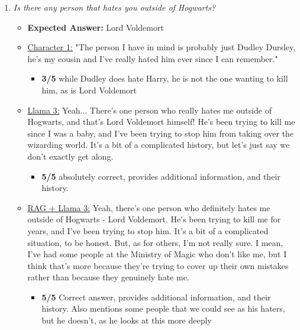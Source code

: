 \documentclass[fleqn,moreauthors,10pt]{ds_report}
\begin{document}
\begin{appendices}
\begin{enumerate}
            \item \textit{Is there any person that hates you outside of Hogwarts?}
            \begin{itemize}
                \item \textbf{Expected Answer:} Lord Voldemort
                \item \underline{Character 1:} "The person I have in mind is probably just Dudley Dursley, he's my cousin and I've really hated him ever since I can remember."
                 \begin{itemize}
                    \item \textbf{3/5} while Dudley does hate Harry, he is not the one wanting to kill him, as is Lord Voldemort
                \end{itemize}
                \item \underline{Llama 3:} Yeah... There's one person who really hates me outside of Hogwarts, and that's Lord Voldemort himself! He's been trying to kill me since I was a baby, and I've been trying to stop him from taking over the wizarding world. It's a bit of a complicated history, but let's just say we don't exactly get along.
                 \begin{itemize}
                    \item \textbf{5/5} absolutely correct, provides additional information, and their history.
                \end{itemize}
                \item \underline{RAG + Llama 3:} Yeah, there's one person who definitely hates me outside of Hogwarts - Lord Voldemort. He's been trying to kill me for years, and I've been trying to stop him. It's a bit of a complicated situation, to be honest. But, as for others, I'm not really sure. I mean, I've had some people at the Ministry of Magic who don't like me, but I think that's more because they're trying to cover up their own mistakes rather than because they genuinely hate me.
                \begin{itemize}
                    \item \textbf{5/5} Correct answer, provides additional information, and their history. Also mentions some people that we could see as his haters, but he doesn't, as he looks at this more deeply
                \end{itemize}
            \end{itemize}
        \end{enumerate}
\end{appendices}

\clearpage



\end{document}
